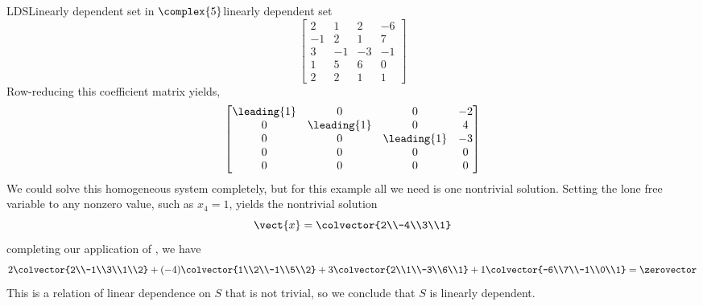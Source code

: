 \begin{example}{LDS}{Linearly dependent set in $\complex{5}$}{linearly dependent set}
\begin{equation*}
\begin{bmatrix}
2&1&2&-6\\
-1&2&1&7\\
3&-1&-3&-1\\
1&5&6&0\\
2&2&1&1
\end{bmatrix}
\end{equation*}
%
Row-reducing this coefficient matrix yields,
%
\begin{equation*}
\begin{bmatrix}
\leading{1}&0&0&-2\\
0&\leading{1}&0&4\\
0&0&\leading{1}&-3\\
0&0&0&0\\
0&0&0&0
\end{bmatrix}
\end{equation*}
%
We could solve this homogeneous system completely, but for this example all we need is one nontrivial solution.  Setting the lone free variable to any nonzero value, such as $x_4=1$, yields the nontrivial solution
%
\begin{equation*}
\vect{x}=\colvector{2\\-4\\3\\1}
\end{equation*}
%
completing our application of , we have
%
\begin{equation*}
2\colvector{2\\-1\\3\\1\\2}+
(-4)\colvector{1\\2\\-1\\5\\2}+
3\colvector{2\\1\\-3\\6\\1}+
1\colvector{-6\\7\\-1\\0\\1}
=\zerovector
\end{equation*}
%
This is a relation of linear dependence on $S$ that is not trivial, so we conclude that $S$ is linearly dependent.
%
\end{example}
%
